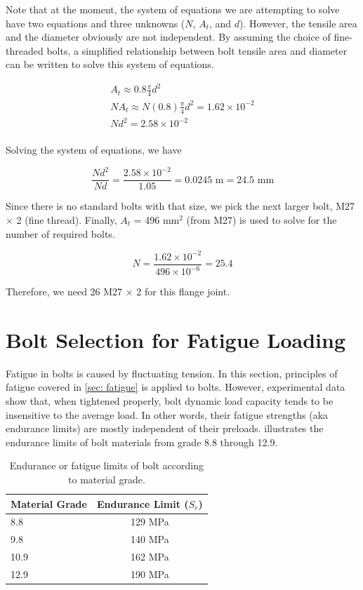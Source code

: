 \documentclass[
10pt,
a4paper,
openany,
svgnames,
]{book}
\begin{document}
\begin{solution}
Note that at the moment, the system of equations we are attempting to solve have two equations and three unknowns ($N$, $A_t$, and $d$). However, the tensile area and the diameter obviously are not independent. By assuming the choice of fine-threaded bolts, a simplified relationship between bolt tensile area and diameter can be written to solve this system of equations.

\[\begin{gathered}
  A_t \approx 0.8\frac{\pi }{4}d^2 \\ 
  NA_t \approx N(0.8)\frac{\pi}{4}d^2 = 1.62 \times 10^{-2} \\ 
  Nd^2 = 2.58 \times 10^{-2} \\ 
\end{gathered} \]

Solving the system of equations, we have

\[\frac{Nd^2}{Nd} = \frac{2.58 \times 10^{-2}}{1.05} = 0.0245 \text{ m} = 24.5 \text{ mm} \]

Since there is no standard bolts with that size, we pick the next larger bolt, M27 $\times$ 2 (fine thread). Finally, $A_t$ = 496 mm$^2$ (from M27) is used to solve for the number of required bolts.

\[N = \frac{1.62 \times 10^{-2}}{496 \times 10^{-6}} = 25.4\]

Therefore, we need 26 M27 $\times$ 2 for this flange joint.
\end{solution}

\section{Bolt Selection for Fatigue Loading}

Fatigue in bolts is caused by fluctuating tension. In this section, principles of fatigue covered in \cref{sec: fatigue} is applied to bolts. However, experimental data show that, when tightened properly, bolt dynamic load capacity tends to be insensitive to the average load. In other words, their fatigue strengths (aka endurance limits) are mostly independent of their preloads.  illustrates the endurance limits of bolt materials from grade 8.8 through 12.9.

\begin{table}[h]
  \centering
  \caption{Endurance or fatigue limits of bolt according to material grade.}
  \label{table: fatigue limit bolt}
    \begin{tabular}{ lc }
      \toprule
      Material Grade & Endurance Limit ($S_e$) \\
      \midrule
      8.8 & 129 MPa \\
      9.8 & 140 MPa \\
      10.9 & 162 MPa \\
      12.9 & 190 MPa \\
      \bottomrule
  \end{tabular}
\end{table}
\end{document}
